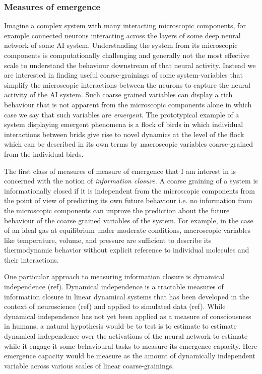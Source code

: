 \documentclass[11pt,a4paper]{article}
\begin{document}
\subsubsection{Measures of emergence}
Imagine a complex system with many interacting microscopic components, for example connected neurons interacting across the layers of some deep neural network of some AI system. Understanding the system from its microscopic components is computationally challenging and generally not the most effective scale to understand the behaviour downstream of that neural activity. Instead we are interested in finding useful coarse-grainings of some system-variables that simplify the microscopic interactions between the neurons to capture the neural activity of the AI system. Such coarse grained variables can display a rich behaviour that is not apparent from the microscopic components alone in which case we say that such variables are \textit{emergent}. The prototypical example of a system displaying emergent phenomena is a flock of birds in which individual interactions between brids give rise to novel dynamics at the level of the flock which can be described in its own terms by macroscopic variables coarse-grained from the individual birds.

The first class of measures of measure of emergence that I am interest in is concerned with the notion of \textit{information closure}. A coarse graining of a system is informationally closed if it is independent from the microscopic components from the point of view of predicting its own future behaviour i.e. no information from the microscopic components can improve the prediction about the future behaviour of the coarse grained variables of the system. For example, in the case of an ideal gas at equilibrium under moderate conditions, macroscopic variables like temperature, volume, and pressure are sufficient to describe its thermodynamic behavior without explicit reference to individual molecules and their interactions. 

One particular approach to measuring information closure is dynamical independence (ref). Dynamical independence is a tractable measures of information closure in linear dynamical systems that has been developed in the context of neuroscience (ref) and applied to simulated data (ref). While dynamical independence has not yet been applied as a measure of consciousness in humans, a natural hypothesis would be to test is to estimate to estimate dynamical independence over the activations of the neural network to estimate while it engage it some behavioural tasks to measure its emergence capacity. Here emergence capacity would be measure as the amount of dynamically independent variable across various scales of linear coarse-grainings.  
\end{document}
